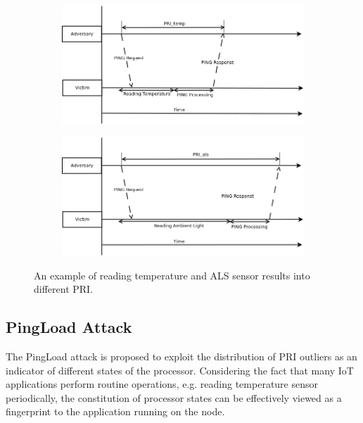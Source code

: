\begin{figure}[ht!]
	\center
	\begin{subfigure}{0.8\textwidth}
	{
		\center
		\includegraphics[width=\textwidth]{fig/PingLoad_temperature.png}
	}
	\end{subfigure}
	\begin{subfigure}{0.8\textwidth}
	{
		\center
		\includegraphics[width=\textwidth]{fig/PingLoad_als.png}
	}
	\end{subfigure}
	\caption{An example of reading temperature and ALS sensor results into different PRI.}
	\label{PingLoadTheory}
\end{figure}

\subsection{PingLoad Attack}
The PingLoad attack is proposed to exploit the distribution of PRI outliers as an indicator of different states of the processor. Considering the fact that many IoT applications perform routine operations, e.g. reading temperature sensor periodically, the constitution of processor states can be effectively viewed as a fingerprint to the application running on the node. 

